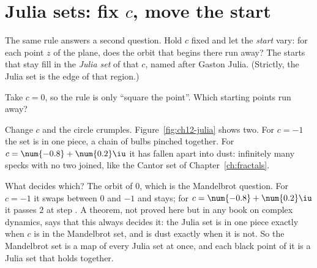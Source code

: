 \section{Julia sets: fix \texorpdfstring{$c$}{c}, move the start}
\label{sec:ch12-julia}

\noindent
The same rule answers a second question. Hold $c$ fixed and let the
\emph{start} vary: for each point $z$ of the plane, does the orbit that
begins there run away? The starts that stay fill in the \emph{Julia set} of
that $c$, named after Gaston Julia. (Strictly, the Julia set is the edge of
that region.)


\begin{think}
Take $c = 0$, so the rule is only \enquote{square the point}. Which starting
points run away?
\end{think}

\noindent
Change $c$ and the circle crumples. Figure~\ref{fig:ch12-julia} shows two. For $c = -1$ the set is in one
piece, a chain of bulbs pinched together. For $c = \num{-0.8} +
\num{0.2}\iu$ it has fallen apart into dust: infinitely many specks with no
two joined, like the Cantor set of Chapter~\ref{ch:fractals}.


\noindent
What decides which? The orbit of $0$, which is the Mandelbrot question. For
$c = -1$ it swaps between $0$ and $-1$ and stays; for $c = \num{-0.8} +
\num{0.2}\iu$ it passes $2$ at step . A theorem, not
proved here but in any book on complex dynamics, says that this always
decides it: the Julia set is in one piece exactly when $c$ is in the
Mandelbrot set, and is dust exactly when it is not. So the Mandelbrot set is
a map of every Julia set at once, and each black point of it is a Julia set
that holds together.

